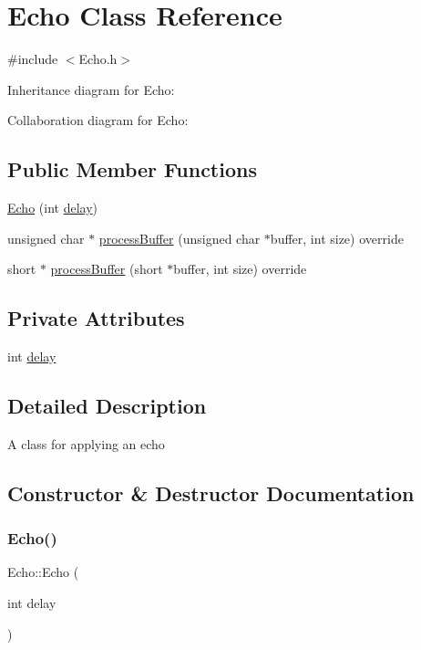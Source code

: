 \hypertarget{classEcho}{}\section{Echo Class Reference}
\label{classEcho}


{\ttfamily \#include $<$Echo.\+h$>$}



Inheritance diagram for Echo\+:


Collaboration diagram for Echo\+:
\subsection*{Public Member Functions}
\begin{DoxyCompactItemize}
\item 
\hyperlink{classEcho_a9531515ffab8be1e38cbdc0e0e9338a6}{Echo} (int \hyperlink{classEcho_abf5c35aa942bfae1832de23bb261e444}{delay})
\item 
unsigned char $\ast$ \hyperlink{classEcho_ad4e1835e48ebf660a529c68beb28e9d0}{process\+Buffer} (unsigned char $\ast$buffer, int size) override
\item 
short $\ast$ \hyperlink{classEcho_aea3e5f4352454ad3182695044ebefacf}{process\+Buffer} (short $\ast$buffer, int size) override
\end{DoxyCompactItemize}
\subsection*{Private Attributes}
\begin{DoxyCompactItemize}
\item 
int \hyperlink{classEcho_abf5c35aa942bfae1832de23bb261e444}{delay}
\end{DoxyCompactItemize}


\subsection{Detailed Description}
A class for applying an echo 

\subsection{Constructor \& Destructor Documentation}
\mbox{\label{classEcho_a9531515ffab8be1e38cbdc0e0e9338a6}} 
\subsubsection{\texorpdfstring{Echo()}{Echo()}}
{\footnotesize\ttfamily Echo\+::\+Echo (\begin{DoxyParamCaption}\item[{int}]{delay }\end{DoxyParamCaption})}


